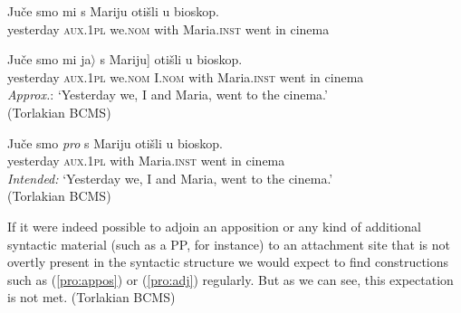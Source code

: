 \documentclass[output=paper,colorlinks,citecolor=brown]{langscibook}
\begin{document}
\ea \label{noapp} 
\ea\label{noapp1} 

\gll Juče smo mi s Mariju otišli u bioskop. \\
yesterday \textsc{aux.1pl} we.\textsc{nom} with Maria.\textsc{inst} went in cinema \\
\ex\label{noapp2}

\gll Juče smo mi \minsp{[$\langle$} ja$\rangle$ s Mariju] otišli u bioskop. \\
 yesterday \textsc{aux.1pl} we.\textsc{nom} {} I.\textsc{nom} with Maria.\textsc{inst} went in cinema \\
\z
\textit{Approx.}: `Yesterday we, I and Maria, went to the cinema.'  \\
 \hfill (Torlakian BCMS)
\z

\ea 
\ea \label{noapp3}

\gll Juče smo \textit{pro} s Mariju otišli u bioskop. \\
 yesterday \textsc{aux.1pl} %
{} with Maria.\textsc{inst} went in cinema \\
\label{noapp4}
\z \textit{Intended:} `Yesterday we, I and Maria, went to the cinema.' \\
\hfill (Torlakian BCMS)
\z

\noindent If it were indeed possible to adjoin an apposition or any kind of additional syntactic material (such as a PP, for instance) to an attachment site that is not overtly present in the syntactic structure we would expect to find constructions such as (\ref{pro:appos}) or (\ref{pro:adj}) regularly. But as we can see, this expectation is not met. 
\ea 
{} \label{pro:app}
 \label{pro:appos}
 \label{pro:adj}
\z \hfill (Torlakian BCMS)\z
\end{document}
